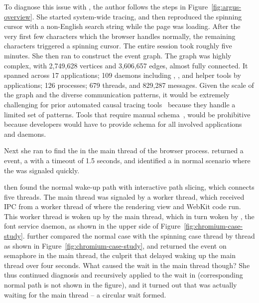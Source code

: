To diagnose this issue with \xxx, the author follows the steps in
Figure~\ref{fig:argus-overview}. She started system-wide tracing, and then
reproduced the spinning cursor with a non-English search string while the
page was loading. After the very first few characters which the browser
handles normally, the remaining characters triggered a spinning cursor. The
entire session took roughly five minutes. She then ran \xxx to construct
the event graph. The graph was highly complex, with 2,749,628 vertices and
3,606,657 edges, almost fully connected. It spanned across 17 applications;
109 daemons including , ,  and
helper tools by applications; 126 processes; 679 threads, and 829,287
messages. Given the scale of the graph and the diverse communication patterns,
it would be extremely challenging for prior automated causal tracing
tools~\cite{aguilera2003performance, zhang2013panappticon, attariyan2012x,
cohen2004correlating} because they handle a limited set of patterns. Tools
that require manual schema~\cite{barham2004using, reynolds2006pip}, would be
prohibitive because developers would have to provide schema for all involved
applications and daemons.

Next she ran \xxx to find the \spinningnode in the main thread of the browser
process. \xxx returned a  event, a  with a
timeout of 1.5 seconds, and identified a \similarnode in normal scenario where
the  was signaled quickly.

\xxx then found the normal wake-up path with interactive path slicing,
which connects five threads. The  main thread was signaled
by a  worker thread, which received IPC from a worker thread
of  where the rendering view and WebKit code run. This
worker thread is woken up by the  main thread, which in
turn woken by , the font service daemon, as shown in the upper
side of Figure~\ref{fig:chromium-case-study}. \xxx further compared
the normal case with the spinning case thread by thread as shown in
Figure~\ref{fig:chromium-case-study}, and returned the  event on
semaphore in the  main thread, the culprit that delayed waking up
the  main thread over four seconds. What caused the wait in the
 main thread though? She thus continued diagnosis and recursively
applied \xxx to the wait in (corresponding normal path is not shown
in the figure), and it turned out that  was actually waiting for
the  main thread -- a circular wait formed.


